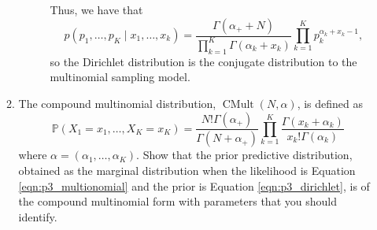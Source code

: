 \documentclass[letterpaper,11pt]{article}
\begin{document}
\begin{enumerate}
\begin{enumerate}
\begin{description}
        Thus, we have that
        \begin{equation}
          p\left(p_1,\ldots,p_K \mid x_1,\ldots,x_k\right)
          =
          \frac{\Gamma\left(\alpha_+ + N\right)}{\prod_{k=1}^K\Gamma\left(\alpha_k + x_k\right)}
          \prod_{k=1}^K p_k^{\alpha_k + x_k  - 1},
          \label{eqn:p3_posterior}          
        \end{equation}
        so the Dirichlet distribution is the conjugate distribution to the
        multinomial sampling model.
      \end{description}
    \item The compound multinomial distribution,
      $\operatorname{CMult}\left(N,\alpha\right)$, is defined as
      \begin{equation}
        \mathbb{P}\left(
          X_1 = x_1,\ldots,X_K = x_K
        \right) =
        \frac{N!\Gamma\left(\alpha_+\right)}{\Gamma\left(N + \alpha_+\right)}
        \prod_{k=1}^K\frac{\Gamma\left(x_k + \alpha_k\right)}{x_k!\Gamma\left(\alpha_k\right)}
        \label{eqn:p3_compound_multinomial}
      \end{equation}
      where $\alpha = \left(\alpha_1,\ldots,\alpha_K\right)$. Show that the
      prior predictive distribution, obtained as the marginal distribution when
      the likelihood is Equation \ref{eqn:p3_multionomial} and the prior is
      Equation \ref{eqn:p3_dirichlet}, is of the compound multinomial
      form with parameters that you should identify.


\end{enumerate}
\end{enumerate}
\end{document}
